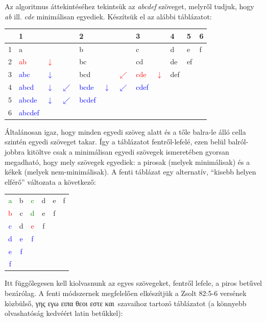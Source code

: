 \documentclass{article}
\newcommand\gr{\selectlanguage{greek}\frenchspacing}
\newcommand\hu{\selectlanguage{magyar}\frenchspacing}
\begin{document}
Az algoritmus áttekintéséhez tekintsük az \textit{abcdef} szöveget, melyről tudjuk, hogy \textit{ab}
ill. \textit{cde} minimálisan egyediek. Készítsük el az alábbi táblázatot:
\begin{center}
\begin{tabular}{r|lc|clc|clc|l|l|l|}
  & 1 & & & 2&  & & 3 & & 4 & 5 & 6\\
\hline
1 & a & & & b & & & c & & d & e & f\\
\hline
2 & \textcolor{red}{ab} & \textcolor{red}{$\downarrow$} & & bc & & & cd & & de & ef & \\
\hline
3 & \textcolor{blue}{abc} & \textcolor{blue}{$\downarrow$} & & bcd & & \textcolor{red}{$\swarrow$} & \textcolor{red}{cde} &  \textcolor{red}{$\downarrow$} & def & & \\
\hline
4 & \textcolor{blue}{abcd} & \textcolor{blue}{$\downarrow$} & \textcolor{blue}{$\swarrow$} & \textcolor{blue}{bcde} & \textcolor{blue}{$\downarrow$} & \textcolor{blue}{$\swarrow$} & \textcolor{blue}{cdef} & & & & \\
\hline
5 & \textcolor{blue}{abcde} & \textcolor{blue}{$\downarrow$} & \textcolor{blue}{$\swarrow$} & \textcolor{blue}{bcdef} & & & & & & & \\
\hline
6 & \textcolor{blue}{abcdef} & & & & & & & & & & \\
\hline
\end{tabular}
\end{center}
Általánosan igaz, hogy minden egyedi szöveg alatt és a tőle balra-le álló cella szintén egyedi szöveget takar. Így a táblázatot
fentről-lefelé, ezen belül balról-jobbra kitöltve csak a minimálisan egyedi szövegek ismeretében gyorsan megadható, hogy
mely szövegek egyediek: a pirosak (melyek minimálisak) és a kékek (melyek nem-minimálisak).
A fenti táblázat egy alternatív, ``kisebb helyen elférő'' változata a következő:
\begin{center}
\begin{tabular}{c c c c c c}
\textcolor{green}{a} & b & \textcolor{green}{c} & d & e & f \\
\textcolor{red}{b} & c & \textcolor{green}{d} & e & f & \\
\textcolor{blue}c & d & \textcolor{red}{e} & f & & \\
\textcolor{blue}d & \textcolor{blue}e & \textcolor{blue}f& & &\\
\textcolor{blue}e & \textcolor{blue}f & & & &\\
\textcolor{blue}f & & & & &
\end{tabular}
\end{center}
Itt függőlegesen kell kiolvasnunk az egyes szövegeket, fentről lefele, a piros betűvel bezárólag.
A fenti módszernek megfelelően elkészítjük
a Zsolt 82:5-6 versének közbülső, \gr γης
εγω ειπα θεοι εστε και\hu\ szavaihoz tartozó táblázatot (a könnyebb olvashatóság
kedvéért latin betűkkel):
\end{document}
